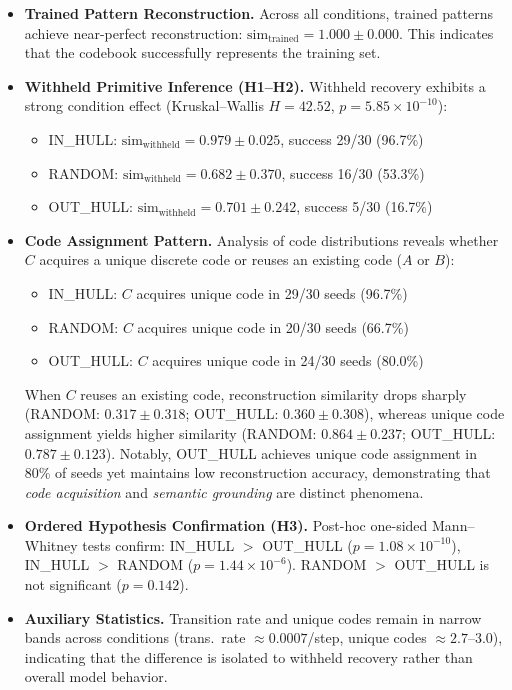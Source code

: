 \documentclass{article}
\begin{document}


\begin{itemize}
    \item \textbf{Trained Pattern Reconstruction.}
    Across all conditions, trained patterns achieve near-perfect reconstruction: $\mathrm{sim}_{\text{trained}} = 1.000 \pm 0.000$.
    This indicates that the codebook successfully represents the training set.

    \item \textbf{Withheld Primitive Inference (H1--H2).}
    Withheld recovery exhibits a strong condition effect (Kruskal--Wallis $H = 42.52$, $p = 5.85 \times 10^{-10}$):
    \begin{itemize}
        \item IN\_HULL: $\mathrm{sim}_{\text{withheld}} = 0.979 \pm 0.025$, success 29/30 (96.7\%)
        \item RANDOM: $\mathrm{sim}_{\text{withheld}} = 0.682 \pm 0.370$, success 16/30 (53.3\%)
        \item OUT\_HULL: $\mathrm{sim}_{\text{withheld}} = 0.701 \pm 0.242$, success 5/30 (16.7\%)
    \end{itemize}

    \item \textbf{Code Assignment Pattern.}
    Analysis of code distributions reveals whether $C$ acquires a unique discrete code or reuses an existing code ($A$ or $B$):
    \begin{itemize}
        \item IN\_HULL: $C$ acquires unique code in 29/30 seeds (96.7\%)
        \item RANDOM: $C$ acquires unique code in 20/30 seeds (66.7\%)
        \item OUT\_HULL: $C$ acquires unique code in 24/30 seeds (80.0\%)
    \end{itemize}
    When $C$ reuses an existing code, reconstruction similarity drops sharply (RANDOM: $0.317 \pm 0.318$; OUT\_HULL: $0.360 \pm 0.308$), whereas unique code assignment yields higher similarity (RANDOM: $0.864 \pm 0.237$; OUT\_HULL: $0.787 \pm 0.123$).
    Notably, OUT\_HULL achieves unique code assignment in 80\% of seeds yet maintains low reconstruction accuracy, demonstrating that \emph{code acquisition} and \emph{semantic grounding} are distinct phenomena.

    \item \textbf{Ordered Hypothesis Confirmation (H3).}
    Post-hoc one-sided Mann--Whitney tests confirm:
    IN\_HULL $>$ OUT\_HULL ($p = 1.08 \times 10^{-10}$),
    IN\_HULL $>$ RANDOM ($p = 1.44 \times 10^{-6}$).
    RANDOM $>$ OUT\_HULL is not significant ($p = 0.142$).

    \item \textbf{Auxiliary Statistics.}
    Transition rate and unique codes remain in narrow bands across conditions (trans.\ rate $\approx 0.0007$/step, unique codes $\approx 2.7$--$3.0$), indicating that the difference is isolated to withheld recovery rather than overall model behavior.
\end{itemize}
\end{document}
